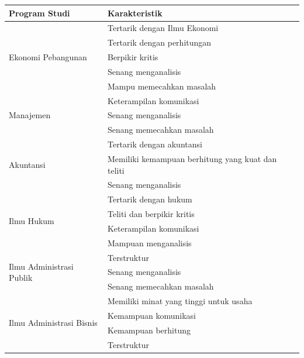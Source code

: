 \begin{longtable}[H]{| p{6cm} | p{8cm} |} %
		\hline
		Program Studi & Karakteristik \\

		\hline
		\multirow{5}{10em}{Ekonomi Pebangunan} & Tertarik dengan Ilmu Ekonomi \\
		& Tertarik dengan perhitungan \\
		& Berpikir kritis \\
		& Senang menganalisis\\
		& Mampu memecahkan masalah\\
		
		\hline
		\multirow{3}{10em}{Manajemen} & Keterampilan komunikasi \\
		& Senang menganalisis\\
		& Senang memecahkan masalah\\
		
		\hline
		\multirow{3}{10em}{Akuntansi} & Tertarik dengan akuntansi \\
		& Memiliki kemampuan berhitung yang kuat dan teliti \\
		& Senang menganalisis\\
		
		\hline
		
		\hline
		\multirow{4}{10em}{Ilmu Hukum} & Tertarik dengan hukum \\
		& Teliti dan berpikir kritis \\
		& Keterampilan komunikasi \\
		& Mampuan menganalisis\\
		
		\hline
		\multirow{3}{10em}{Ilmu Administrasi Publik} & Terstruktur \\
		& Senang menganalisis\\
		& Senang memecahkan masalah\\
		
		\hline
		\multirow{4}{10em}{Ilmu Administrasi Bisnis} & Memiliki minat yang tinggi untuk usaha \\
		& Kemampuan komunikasi\\
		& Kemampuan berhitung\\
		& Terstruktur\\
		

\end{longtable}
